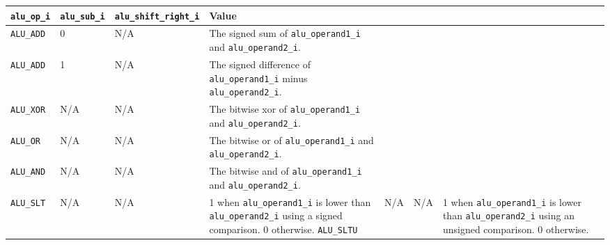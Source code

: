 {
\footnotesize
\begin{tabularx}{0.9\textwidth}{|l|l|l|X|}
  \hline
  \textbf{\texttt{alu\_op\_i}} & \textbf{\texttt{alu\_sub\_i}} & \textbf{\texttt{alu\_shift\_right\_i}} & \textbf{Value} \\
  \hline
  \texttt{ALU\_ADD} & 0 & N/A & The signed sum of \texttt{alu\_operand1\_i} and \texttt{alu\_operand2\_i}. \\
  \hline
  \texttt{ALU\_ADD} & 1 & N/A & The signed difference of \texttt{alu\_operand1\_i} minus \texttt{alu\_operand2\_i}. \\
  \hline
  \texttt{ALU\_XOR} & N/A & N/A & The bitwise xor of \texttt{alu\_operand1\_i} and \texttt{alu\_operand2\_i}. \\
  \hline
  \texttt{ALU\_OR} & N/A & N/A & The bitwise or of \texttt{alu\_operand1\_i} and \texttt{alu\_operand2\_i}. \\
  \hline
  \texttt{ALU\_AND} & N/A & N/A & The bitwise and of \texttt{alu\_operand1\_i} and \texttt{alu\_operand2\_i}. \\
  \hline
  \texttt{ALU\_SLT} & N/A & N/A & 1 when \texttt{alu\_operand1\_i} is lower than \texttt{alu\_operand2\_i} using a signed comparison. 0 otherwise.
  \hline
  \texttt{ALU\_SLTU} & N/A & N/A & 1 when \texttt{alu\_operand1\_i} is lower than \texttt{alu\_operand2\_i} using an unsigned comparison. 0 otherwise.
  \hline

\end{tabularx}
}
